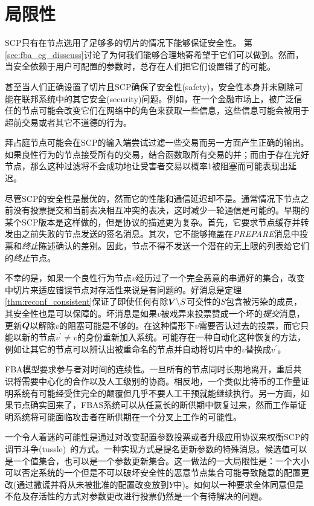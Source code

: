 \section{局限性}\label{sec:limit}

SCP只有在节点选用了足够多的{\quorum}切片的情况下能够保证安全性。	第\ref{sec:fba_eg_disscuss}讨论了为何我们能够合理地寄希望于它们可以做到。然而，当安全依赖于用户可配置的参数时，总存在人们把它们设置错了的可能。

甚至当人们正确设置了{\quorum}切片且SCP确保了安全性(safety)，安全性本身并未剔除可能在联邦系统中的其它安全(security)问题。例如，在一个金融市场上，被广泛信任的节点可能会改变它们在网络中的角色来获取一些信息，这些信息可能会被用于超前交易或者其它不道德的行为。

拜占庭节点可能会在SCP的输入端尝试过滤一些交易而另一方面产生正确的输出。如果良性行为的节点接受所有的交易，结合函数取所有交易的并；而由于存在完好节点，那么这种过滤将不会成功地让受害者交易以概率1被阻塞而可能表现出延迟。

尽管SCP的安全性是最优的，然而它的性能和通信延迟却不是。通常情况下节点之前没有投票提交和当前表决相互冲突的表决，这时减少一轮通信是可能的。早期的某个SCP版本是这样做的，但是协议的描述更为复杂。首先，它要求节点缓存并转发由之前失败的节点发送的签名消息。其次，它不能够掩盖在\textsl{PREPARE}消息中投票和\textit{终止}陈述确认的差别。因此，节点不得不发送一个潜在的无上限的列表给它们的\textit{终止}节点。

不幸的是，如果一个良性行为节点$v$经历过了一个完全恶意的串通好的{\vblock}集合，改变{\slot}中切片来适应错误节点对存活性来说是有问题的。好消息是定理\ref{thm:reconf_consistent}保证了即使任何有除${\bm V}\backslash S${\quorum}可交性的$S$包含被污染的成员，其安全性也是可以保障的。坏消息是如果$v$被戏弄来投票赞成一个坏的\textit{提交}消息，更新${\bm Q}$以解除$v$的阻塞可能是不够的。在这种情形下$v$需要否认过去的投票，而它只能以新的节点$v^{\prime}\neq v$的身份重新加入系统。可能存在一种自动化这种恢复的方法，例如让其它的节点可以辨认出被重命名的节点并自动将切片中的$v$替换成$v^{\prime}$。

FBA模型要求参与者对时间的连续性。一旦所有的节点同时长期地离开，重启共识将需要中心化的合作以及人工级别的协商。相反地，一个类似比特币的工作量证明系统有可能经受住完全的颠覆但几乎不要人工干预就能继续执行。另一方面，如果节点确实回来了，FBAS系统可以从任意长的断供期中恢复过来，然而工作量证明系统将可能面临攻击者在断供期在一个分叉上工作的可能性。

一个令人着迷的可能性是通过对改变配置参数投票或者升级应用协议来权衡SCP的调节斗争(tussle)~\cite{Clark:2005:TCD:1074047.1074049}的方式。一种实现方式是提名更新参数的特殊消息。候选值可以是一个值集合，也可以是一个参数更新集合。这一做法的一大局限性是：一个大小可以否定系统的一个{\quorum}但是不可以破坏安全性的恶意节点集合可能导致随意的配置更改(通过撒谎并将从未被批准的配置改变放到$Y$中)。如何以一种要求全体{\quorum}同意但是不危及存活性的方式对参数更改进行投票仍然是一个有待解决的问题。